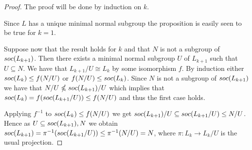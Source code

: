 \begin{proof}
    The proof will be done by induction on $k$.

    Since $L$ has a unique minimal normal subgroup the proposition is easily seen to be true for $k=1$.
    
    Suppose now that the result holds for $k$ and that $N$ is not a subgroup of $soc {(L_{k+1})}$. Then there exists a minimal normal subgroup $U$ of $L_{k+1}$ such that $U \subseteq N$.
    We have that $L_{k+1}/U \cong L_{k}$ by some isomorphism $f$.
    By induction either $soc {(L_{k})} \le f(N/U)$ or $f(N/U) \le soc {(L_k)}$. Since $N$ is not a subgroup of $soc {(L_{k+1})}$ we have that $N/U \nleqslant soc {(L_{k+1})}/U$ which implies that $soc {(L_k)} = f(soc {(L_{k+1}/U)}) \le f(N/U)$ and thus the first case holds.
    
    Applying $f^{-1}$ to $soc {(L_k)} \le f(N/U)$ we get $soc {(L_{k+1})}/U \subseteq soc {(L_{k+1}/U)} \le N/U$. Hence as $U \subseteq soc {(L_{k+1})}, N$ we obtain $soc {(L_{k+1})} = \pi^{-1}(soc {(L_{k+1}/U)}) \le \pi^{-1}(N/U) = N$, where $\pi: L_k \rightarrow L_k/U$ is the usual projection.
\end{proof}